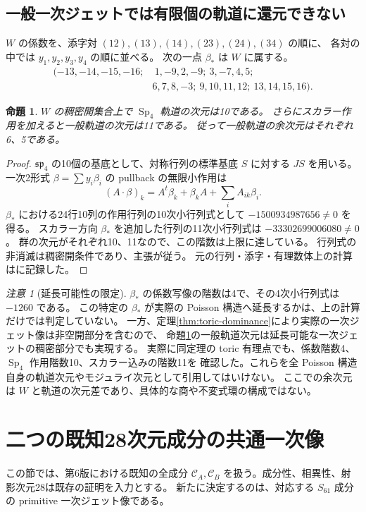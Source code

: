 \documentclass[11pt,a4paper]{ltjsarticle}
\DeclareMathOperator{\Sp}{Sp}
\newtheorem{proposition}[theorem]{命題}
\theoremstyle{remark}
\newtheorem{remark}[theorem]{注意}
\begin{document}
\subsection{一般一次ジェットでは有限個の軌道に還元できない}
$W$ の係数を、添字対 $(12),(13),(14),(23),(24),(34)$ の順に、
各対の中では $y_1,y_2,y_3,y_4$ の順に並べる。
次の一点 $\beta_*$ は $W$ に属する。
\[
\begin{split}
 (-13,-14,-15,-16;&\ 1,-9,2,-9;\ 3,-7,4,5;\\
 &6,7,8,-3;\ 9,10,11,12;\ 13,14,15,16).
\end{split}
\]
\begin{proposition}\label{prop:generic-orbit}
$W$ の稠密開集合上で $\Sp_4$ 軌道の次元は10である。
さらにスカラー作用を加えると一般軌道の次元は11である。
従って一般軌道の余次元はそれぞれ6、5である。
\end{proposition}
\begin{proof}
$\mathfrak{sp}_4$ の10個の基底として、対称行列の標準基底 $S$ に対する $JS$ を用いる。
一次2形式 $\beta=\sum y_i\beta_i$ の pullback の無限小作用は
\[
 (A\cdot\beta)_k=A^t\beta_k+\beta_k A+\sum_i A_{ik}\beta_i.
\]
$\beta_*$ における24行10列の作用行列の10次小行列式として
$-1500934987656\ne0$ を得る。
スカラー方向 $\beta_*$ を追加した行列の11次小行列式は
$-33302699006080\ne0$。
群の次元がそれぞれ10、11なので、この階数は上限に達している。
行列式の非消滅は稠密開条件であり、主張が従う。
元の行列・添字・有理数体上の計算は\cite{weight1-certificate}に記録した。
\end{proof}

\begin{remark}[延長可能性の限定]
$\beta_*$ の係数写像の階数は4で、その4次小行列式は $-1260$ である。
この特定の $\beta_*$ が実際の Poisson 構造へ延長するかは、上の計算だけでは判定していない。
一方、定理\ref{thm:toric-dominance}により実際の一次ジェット像は非空開部分を含むので、
命題\ref{prop:generic-orbit}の一般軌道次元は延長可能な一次ジェットの稠密部分でも実現する。
実際に同定理の toric 有理点でも、係数階数4、$\Sp_4$ 作用階数10、スカラー込みの階数11を
確認した。これらを全 Poisson 構造自身の軌道次元やモジュライ次元として引用してはいけない。
ここでの余次元は $W$ と軌道の次元差であり、具体的な商や不変式環の構成ではない。
\end{remark}

\section{二つの既知28次元成分の共通一次像}\label{sec:ambient}
この節では、第6版\cite{ambient-source}における既知の全成分
$\mathcal C_A,\mathcal C_B$ を扱う。成分性、相異性、射影次元28は既存の証明を入力とする。
新たに決定するのは、対応する $S_{61}$ 成分の primitive 一次ジェット像である。
\end{document}
